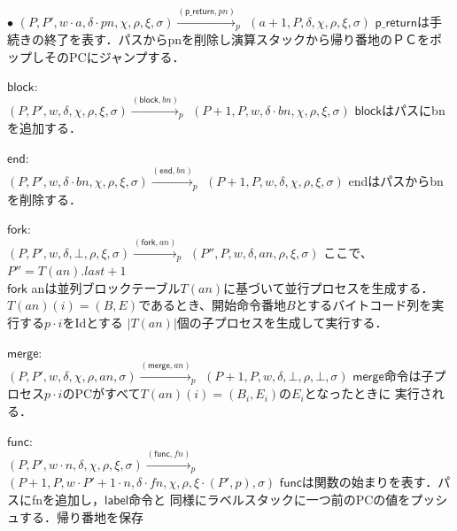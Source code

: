 \documentclass[submit,PRO]{ipsj}
\newcommand{\bcode}[1]{$\mathsf{#1}$}
\begin{document}
\begin{list}{$\bullet$}{}
$(P,P',w\cdot a,\delta\cdot pn,\chi,\rho,\xi,\sigma)\xrightarrow{(\mathsf{p\_return},pn)}_p$\newline
\qquad $(a+1,P,\delta,\chi,\rho,\xi,\sigma)$\newline
\bcode{p\_return}は手続きの終了を表す．パスからpnを削除し演算スタックから帰り番地のＰＣをポップしそのPCにジャンプする．
\item \bcode{block}:\\
$(P,P',w,\delta,\chi,\rho,\xi,\sigma)\xrightarrow{(\mathsf{block},bn)}_p$\newline
\qquad $(P+1,P,w,\delta\cdot bn,\chi,\rho,\xi,\sigma)$\newline
\bcode{block}はパスにbnを追加する．
\item \bcode{end}:\\
$(P,P',w,\delta\cdot bn,\chi,\rho,\xi,\sigma)\xrightarrow{(\mathsf{end},bn)}_p$\newline
\qquad $(P+1,P,w,\delta,\chi,\rho,\xi,\sigma)$\newline
endはパスからbnを削除する．
\item \bcode{fork}:\\
$(P,P',w,\delta,\bot,\rho,\xi,\sigma)\xrightarrow{(\mathsf{fork},an)}_p$\newline
\qquad $(P'',P,w,\delta,an,\rho,\xi,\sigma)$\newline
ここで、$P''=T(an).last+1$\\
\bcode{fork} anは並列ブロックテーブル$T(an)$に基づいて並行プロセスを生成する．
$T(an)(i)=(B,E)$であるとき、開始命令番地$B$とするバイトコード列を実行する$p\cdot i$をIdとする
$|T(an)|$個の子プロセスを生成して実行する．
\item \bcode{merge}:\\
$(P,P',w,\delta,\chi,\rho,an,\sigma)\xrightarrow{(\mathsf{merge},an)}_p$\newline
\qquad $(P+1,P,w,\delta,\bot,\rho,\bot,\sigma)$\newline
\bcode{merge}命令は子プロセス$p\cdot i$のPCがすべて$T(an)(i)=(B_i,E_i)$の$E_i$となったときに
実行される．
\item \bcode{func}:\\
$(P,P',w\cdot n,\delta,\chi,\rho,\xi,\sigma)\xrightarrow{(\mathsf{func},fn)}_p$\newline
\qquad $(P+1,P,w\cdot P'+1\cdot n,\delta\cdot fn,\chi,\rho,\xi\cdot(P',p),\sigma)$\newline
\bcode{func}は関数の始まりを表す．パスにfnを追加し，\bcode{label}命令と
      同様にラベルスタックに一つ前のPCの値をプッシュする．帰り番地を保存

\end{list}
\end{document}
